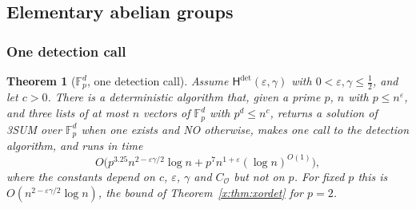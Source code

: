 \documentclass[11pt]{article}
\newtheorem{theorem}{Theorem}[section]
\theoremstyle{definition}
\theoremstyle{remark}
\newcommand{\Fp}{\mathbb{F}_p}
\newcommand{\eps}{\varepsilon}
\newcommand{\Hyp}{\mathsf{H}}
\begin{document}
\subsection{Elementary abelian groups}\label{g:sec:elementary}

\subsubsection{One detection call}

\begin{theorem}[$\Fp^d$, one detection call]\label{g:thm:A}
Assume $\Hyp^{\det}(\eps,\gamma)$ with $0<\eps,\gamma\le\frac12$, and let $c>0$. There is a deterministic algorithm that, given a prime $p$, $n$ with $p\le n^\eps$, and three lists of at most $n$ vectors of $\Fp^d$ with $p^d\le n^c$, returns a solution of 3SUM over $\Fp^d$ when one exists and NO otherwise, makes one call to the detection algorithm, and runs in time
\[
O\bigl(p^{3.25}n^{2-\eps\gamma/2}\log n+p^7n^{1+\eps}(\log n)^{O(1)}\bigr),
\]
where the constants depend on $c$, $\eps$, $\gamma$ and $C_{\mathcal O}$ but not on $p$. For fixed $p$ this is $O(n^{2-\eps\gamma/2}\log n)$, the bound of Theorem~\ref{x:thm:xordet} for $p=2$.
\end{theorem}
\end{document}
